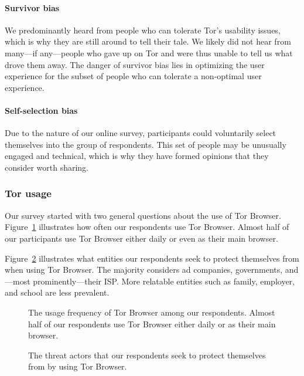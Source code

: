 \paragraph{Survivor bias}
We predominantly heard from people who can tolerate Tor's usability issues,
which is why they are still around to tell their tale.  We likely did not hear
from many---if any---people who gave up on Tor and were thus unable to tell us
what drove them away.  The danger of survivor bias lies in optimizing the user
experience for the subset of people who can tolerate a non-optimal user
experience.

\paragraph{Self-selection bias}
Due to the nature of our online survey, participants could voluntarily select
themselves into the group of respondents.  This set of people may be unusually
engaged and technical, which is why they have formed opinions that they
consider worth sharing.

\subsubsection{Tor usage}

Our survey started with two general questions about the use of Tor Browser.
Figure~\ref{fig:tor-usage} illustrates how often our respondents use Tor
Browser.  Almost half of our participants use Tor Browser either daily or even
as their main browser.

Figure~\ref{fig:tor-threats} illustrates what entities our respondents seek to
protect themselves from when using Tor Browser.  The majority considers ad
companies, governments, and---most prominently---their ISP.  More relatable
entities such as family, employer, and school are less prevalent.

\begin{figure}[t]
    \centering
    
    \caption{The usage frequency of Tor Browser among our respondents.  Almost
    half of our respondents use Tor Browser either daily or as their main
    browser.}
    \label{fig:tor-usage}
\end{figure}

\begin{figure}[t]
    \centering
    
    \caption{The threat actors that our respondents seek to protect themselves
        from by using Tor Browser.}
    \label{fig:tor-threats}
\end{figure}

